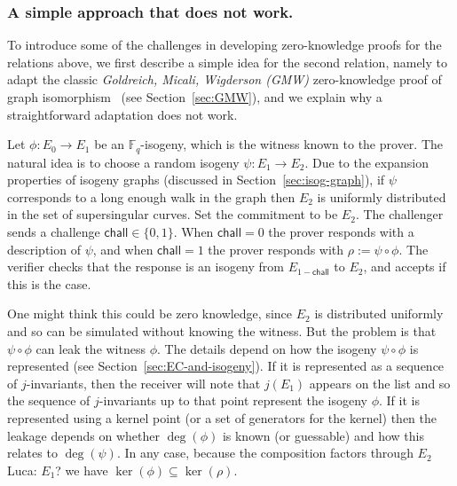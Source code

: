 \documentclass{llncs}
\newcommand{\chall}{\mathsf{chall}}
\newcommand{\F}{\ensuremath{\mathbb{F}}}
\newcommand{\comment}[1]{{\color{gray}#1}}
\newcommand{\LDF}[1]{\comment{Luca: #1}}
\begin{document}
\subsubsection{A simple approach that does not work.}\label{sec:simple}


               
To introduce some of the challenges in developing zero-knowledge proofs for the relations above, we first describe a simple idea for the second relation, namely to adapt the classic \emph{Goldreich, Micali, Wigderson (GMW)} zero-knowledge proof of graph isomorphism~\cite{GMW} (see Section~\ref{sec:GMW}), and we explain why a straightforward adaptation does not work. 

Let $\phi : E_0 \to E_1$ be an $\F_q$-isogeny, which is the witness known to the prover.
The natural idea is to choose a random isogeny $\psi : E_1 \to E_2$.
Due to the expansion properties of isogeny graphs (discussed in Section~\ref{sec:isog-graph}), if $\psi$ corresponds to a long enough walk in the graph then $E_2$ is uniformly distributed in the set of supersingular curves.
Set the commitment to be $E_2$.
The challenger sends a challenge $\chall \in \{0,1\}$.
When $\chall = 0$ the prover responds with a description of $\psi$, and when $\chall=1$ the prover responds with $\rho := \psi \circ \phi$.
The verifier checks that the response is an isogeny from $E_{1-\chall}$ to $E_2$, and accepts if this is the case.

One might think this could be zero knowledge, since $E_2$ is distributed uniformly and so can be simulated without knowing the witness.
But the problem is that $\psi \circ \phi$ can leak the witness $\phi$.
The details depend on how the isogeny $\psi \circ \phi$ is represented (see Section~\ref{sec:EC-and-isogeny}). If it is represented as a sequence of $j$-invariants, then the receiver will note that $j(E_1)$ appears on the list and so the sequence of $j$-invariants up to that point represent the isogeny $\phi$.
If it is represented using a kernel point (or a set of generators for the kernel) then the leakage depends on whether $\deg(\phi)$ is known (or guessable) and how this relates to $\deg(\psi)$. In any case, because the composition factors through $E_2$ \LDF{$E_1$?} we have $\ker(\phi) \subseteq \ker( \rho )$.
\end{document}
